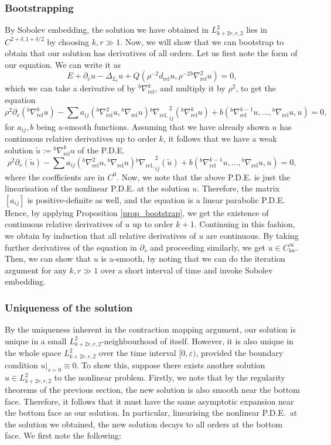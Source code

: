 \documentclass[10pt, a4paper]{article}
\theoremstyle{plain}%
\theoremstyle{definition}
\numberwithin{figure}{section}
\numberwithin{equation}{section}
\newcommand{\pa}{\partial}
\newcommand{\ep}{\varepsilon}
\newcommand{\rel}{\mathrm{rel}}
\newcommand{\loc}{\mathrm{loc}}
\begin{document}
\subsubsection{Bootstrapping}
By Sobolev embedding, the solution we have obtained in $L^2_{k+2r,r,2}$ lies in $C^{2+\delta,1+\delta/2}$ by choosing $k,r\gg 1$. Now, we will show that we can bootstrap to obtain that our solution has derivatives of all orders. Let us first note the form of our equation. We can write it as\[
E+\pa_vu -\Delta_{L_t}u+Q(\rho^{-2}d_\mathrm{rel}u,\rho^{-2}{^b\nabla^2_\mathrm{rel}u})=0,
\]
which we can take a derivative of by $^b\nabla_\mathrm{rel}^k$, and multiply it by $\rho^2$, to get the equation \begin{equation}\label{eq_bootstrap}
	\rho^2\pa_v(^b\nabla_\mathrm{rel}^ku) - \sum a_{ij}(^b\nabla_\mathrm{rel}^2u,{^b\nabla}_\mathrm{rel} u){^b\nabla_\mathrm{rel,}}^2_{ij}(^b\nabla_\mathrm{rel}^ku) +b(^b\nabla_\rel^{k-1}u,\dots,{^b\nabla}_\mathrm{rel} u, u)=0,
\end{equation}
for $a_{ij},b$ being a-smooth functions. Assuming that we have already shown $u$ has continuous relative derivatives up to order $k$, it follows that we have a weak solution $\tilde{u}:={^b\nabla^k_\mathrm{rel} u}$ of the P.D.E.\[
\rho^2\pa_v(\tilde{u}) - \sum a_{ij}(^b\nabla_\mathrm{rel}^2u,{^b\nabla}_\mathrm{rel} u){^b\nabla_\mathrm{rel,}}^2_{ij}(\tilde{u}) +b(^b\nabla_\rel^{k-1}u,\dots,{^b\nabla}_\mathrm{rel} u, u)=0,
\]
where the coefficients are in $C^0$. Now, we note that the above P.D.E. is just the linearisation of the nonlinear P.D.E. at the solution $u$. Therefore, the matrix $[a_{ij}]$ is positive-definite as well, and the equation is a linear parabolic P.D.E. Hence, by applying Proposition \ref{prop_bootstrap}, we get the existence of continuous relative derivatives of $u$ up to order $k+1$. Continuing in this fashion, we obtain by induction that all relative derivatives of $u$ are continuous. By taking further derivatives of the equation in $\pa_s$ and proceeding similarly, we get $u\in C^\infty_\loc$. Then, we can show that $u$ is a-smooth, by noting that we can do the iteration argument for any $k,r\gg1$ over a short interval of time and invoke Sobolev embedding.

\subsubsection{Uniqueness of the solution}

By the uniqueness inherent in the contraction mapping argument, our solution is unique in a small $L^2_{k+2r,r,2}$-neighbourhood of itself. However, it is also unique in the whole space $L^2_{k+2r,r,2}$ over the time interval $[0,\ep)$, provided the boundary condition $u|_{s=0}\equiv 0$. To show this, suppose there exists another solution $u\in L^2_{k+2r,r,2}$ to the nonlinear problem. Firstly, we note that by the regularity theorems of the previous section, the new solution is also smooth near the bottom face. Therefore, it follows that it must have the same asymptotic expansion near the bottom face as our solution. In particular, linearising the nonlinear P.D.E.\ at the solution we obtained, the new solution decays to all orders at the bottom face. We first note the following:
\end{document}
